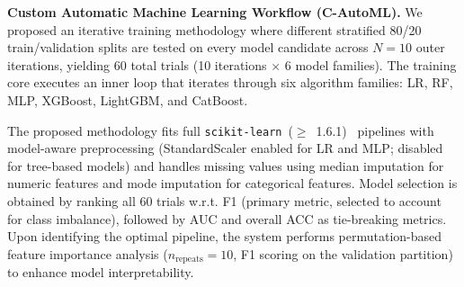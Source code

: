 \documentclass[diagnostics,article,submit,pdftex,moreauthors]{Definitions/mdpi}
\begin{document}
\textbf{Custom Automatic Machine Learning Workflow (C-AutoML).}
We proposed an iterative training methodology where different stratified
80/20 train/validation splits are tested on every model candidate
across $N = 10$ outer iterations, yielding 60 total trials
(10 iterations $\times$ 6 model families). The training core executes
an inner loop that iterates through six algorithm families: \ac{LR},
\ac{RF}, \ac{MLP}, XGBoost, LightGBM, and CatBoost.


The proposed methodology fits full
\texttt{scikit-learn}~($\ge$~1.6.1)~\cite{sklearn-api} pipelines with
model-aware preprocessing (StandardScaler enabled for \ac{LR} and
\ac{MLP}; disabled for tree-based models) and handles missing values
using median imputation for numeric features and mode imputation for
categorical features. Model selection is obtained by ranking all
60 trials \ac{w.r.t.} \ac{F1} (primary metric, selected to account
for class imbalance), followed by \ac{AUC} and overall \ac{ACC} as
tie-breaking metrics. Upon identifying the optimal pipeline, the
system performs permutation-based feature importance analysis
($n_{\mathrm{repeats}} = 10$, \ac{F1} scoring on the validation
partition) to enhance model interpretability.
\end{document}
